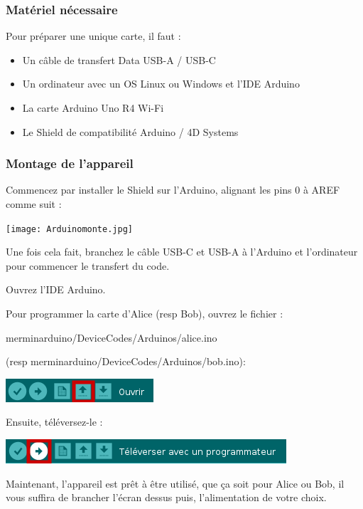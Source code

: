 \documentclass[11pt]{article}
\begin{document}
\subsubsection{Matériel nécessaire}

Pour préparer une unique carte, il faut :

\begin{itemize}
	\item Un câble de transfert Data USB-A / USB-C
	\item Un ordinateur avec un OS Linux ou Windows et l'IDE Arduino
	\item La carte Arduino Uno R4 Wi-Fi
	\item Le Shield de compatibilité Arduino / 4D Systems
\end{itemize}

\newpage

\subsubsection{Montage de l'appareil}

Commencez par installer le Shield sur l'Arduino, alignant les pins 0 à AREF comme suit :

\texttt{[image: Arduinomonte.jpg]}

\noindent Une fois cela fait, branchez le câble USB-C et USB-A à l'Arduino et l'ordinateur pour commencer le transfert du code.

\noindent Ouvrez l'IDE Arduino.

\noindent Pour programmer la carte d'Alice (resp Bob), ouvrez le fichier :

\noindent merminarduino/DeviceCodes/Arduinos/alice.ino 

\noindent(resp merminarduino/DeviceCodes/Arduinos/bob.ino):

\includegraphics[width=\textwidth]{OuvrirArduino.png}

\noindent Ensuite, téléversez-le :

\includegraphics[width=\textwidth]{TeleverserArduino.png}

\noindent Maintenant, l'appareil est prêt à être utilisé, que ça soit pour Alice ou Bob, il vous suffira de brancher l'écran dessus puis, l'alimentation de votre choix.
\end{document}
